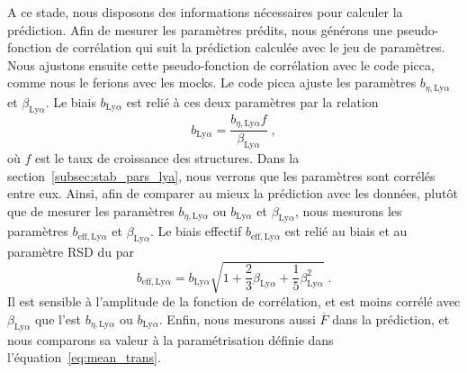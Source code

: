 A ce stade, nous disposons des informations nécessaires pour calculer la prédiction. Afin de mesurer les paramètres \lya{} prédits, nous générons une pseudo-fonction de corrélation qui suit la prédiction calculée avec le jeu de paramètres. Nous ajustons ensuite cette pseudo-fonction de corrélation avec le code picca, comme nous le ferions avec les mocks.
  Le code picca ajuste les paramètres $b_{\eta, \mathrm{Ly}\alpha}$ et $\beta_{\mathrm{Ly}\alpha}$. Le biais $b_{\mathrm{Ly}\alpha}$ est relié à ces deux paramètres par la relation
  \begin{equation}
    \label{eq:def_bias}
    b_{\mathrm{Ly}\alpha}  = \frac{b_{\eta, \mathrm{Ly}\alpha} f}{\beta_{\mathrm{Ly}\alpha}} \; ,
  \end{equation}
  où $f$ est le taux de croissance des structures.
  Dans la section~\ref{subsec:stab_pars_lya}, nous verrons que les paramètres \lya{} sont corrélés entre eux.
  Ainsi, afin de comparer au mieux la prédiction avec les données, plutôt que de mesurer les paramètres $b_{\eta, \mathrm{Ly}\alpha}$ ou $b_{\mathrm{Ly}\alpha}$ et $\beta_{\mathrm{Ly}\alpha}$, nous mesurons les paramètres $b_{\mathrm{eff},\mathrm{Ly}\alpha}$ et $\beta_{\mathrm{Ly}\alpha}$.
  Le biais effectif $b_{\mathrm{eff},\mathrm{Ly}\alpha}$ est relié au biais et au paramètre RSD du \lya{} par
  \begin{equation}
    \label{eq:def_bias_eff}
    b_{\mathrm{eff},\mathrm{Ly}\alpha} = b_{\mathrm{Ly}\alpha} \sqrt{1 + \frac{2}{3} \beta_{\mathrm{Ly}\alpha} + \frac{1}{5} \beta_{\mathrm{Ly}\alpha}^2} \; .
  \end{equation}
  Il est sensible à l'amplitude de la fonction de corrélation, et est moins corrélé avec $\beta_{\mathrm{Ly}\alpha}$ que l'est $b_{\eta, \mathrm{Ly}\alpha}$ ou $b_{\mathrm{Ly}\alpha}$.
  Enfin, nous mesurons aussi $\overline F$ dans la prédiction, et nous comparons sa valeur à la paramétrisation définie dans l'équation~\ref{eq:mean_trans}.
